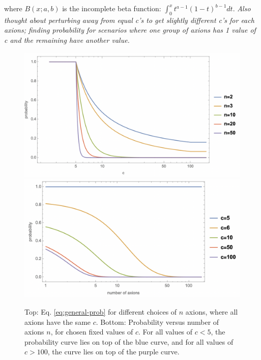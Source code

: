\documentclass{article}
\begin{document}
\noindent where $B(x;a,b)$ is the incomplete beta function: $\int_0^x t^{a-1}(1-t)^{b-1} dt$.
\emph{Also thought about perturbing away from equal c's to get slightly different c's for each axions; finding probability for scenarios where one group of axions has 1 value of c and the remaining have another value.}

\begin{figure}[h]
    \includegraphics[scale=0.45]{figs/naxions-equalC.png}
    \includegraphics[scale=0.5]{figs/naxions-equalC-vsN.png}
    \centering
    \caption{Top: Eq. \eqref{eq:general-prob} for different choices of $n$ axions, where all axions have the same $c$. Bottom: Probability versus number of axions $n$, for chosen fixed values of $c$. For all values of $c<5$, the probability curve lies on top of the blue curve, and for all values of $c>100$, the curve lies on top of the purple curve.}
    \label{fig:n-prob-equalC}
\end{figure}

\break
\end{document}
